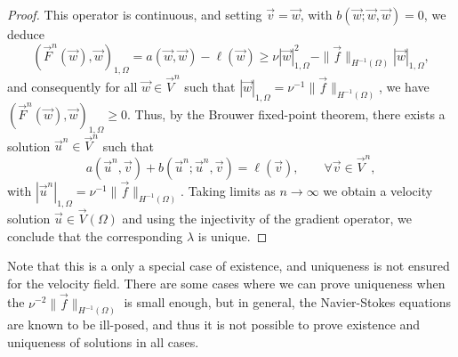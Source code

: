 \begin{theorem}
\begin{proof}
        This operator is continuous, and setting $\vec v =\vec w$, with $b(\vec w;\vec w, \vec w) = 0$, we deduce 
        \begin{equation*}
            (\vec F^n(\vec w), \vec w)_{1,\Omega} = a(\vec w, \vec w) - \ell(\vec w) \geq \nu|\vec w|^2_{1,\Omega} - \|\vec f\|_{H^{-1}(\Omega)}|\vec w|_{1,\Omega},
        \end{equation*}
        and consequently for all $\vec w\in\vec V^n$ such that $|\vec w|_{1,\Omega} = \nu^{-1}\|\vec f\|_{H^{-1}(\Omega)}$, we have $(\vec F^n(\vec w), \vec w)_{1,\Omega} \geq 0$. Thus, by the Brouwer fixed-point theorem, there exists a solution $\vec u^n\in\vec V^n$ such that 
        \begin{equation*}
            a(\vec u^n, \vec v) + b(\vec u^n; \vec u^n, \vec v)  = \ell(\vec v), \qquad \forall \vec v\in\vec V^n,
        \end{equation*}
        with $|\vec u^n|_{1,\Omega} = \nu^{-1}\|\vec f\|_{H^{-1}(\Omega)}$. Taking limits as $n\to\infty$ we obtain a velocity solution $\vec u\in\vec V(\Omega)$ and using the injectivity of the gradient operator, we conclude that the corresponding $\lambda$ is unique. 
    \end{proof}
\end{theorem}

Note that this is a only a special case of existence, and uniqueness is not ensured for the velocity field. There are some cases where we can prove uniqueness when the $\nu^{-2}\|\vec f\|_{H^{-1}(\Omega)}$ is small enough, but in general, the Navier-Stokes equations are known to be ill-posed, and thus it is not possible to prove existence and uniqueness of solutions in all cases.


